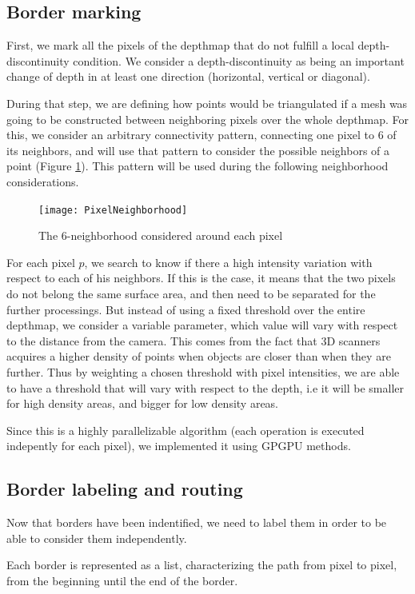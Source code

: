 \documentclass[11pt,fleqn]{book} %
\begin{document}
\subsection{Border marking}
First, we mark all the pixels of the depthmap that do not fulfill a local depth-discontinuity condition. We consider a depth-discontinuity as being an important change of depth in at least one direction (horizontal, vertical or diagonal).

During that step, we are defining how points would be triangulated if a mesh was going to be constructed between neighboring pixels over the whole depthmap. 
For this, we consider an arbitrary connectivity pattern, connecting one pixel to 6 of its neighbors, and will use that pattern to consider the possible neighbors of a point (Figure \ref{fig:pixel_neighborhood}). 
This pattern will be used during the following neighborhood considerations.

\begin{figure}[ht]
\centering\texttt{[image: PixelNeighborhood]}
\caption{The 6-neighborhood considered around each pixel}
\label{fig:pixel_neighborhood}
\end{figure}

For each pixel $p$, we search to know if there a high intensity variation with respect to each of his neighbors. If this is the case, it means that the two pixels do not belong the same surface area, and then need to be separated for the further processings.
But instead of using a fixed threshold over the entire depthmap, we consider a variable parameter, which value will vary with respect to the distance from the camera.
This comes from the fact that 3D scanners acquires a higher density of points when objects are closer than when they are further. 
Thus by weighting a chosen threshold with pixel intensities, we are able to have a threshold that will vary with respect to the depth, i.e it will be smaller for high density areas, and bigger for low density areas.

Since this is a highly parallelizable algorithm (each operation is executed indepently for each pixel), we implemented it using GPGPU methods.

\subsection{Border labeling and routing}
Now that borders have been indentified, we need to label them in order to be able to consider them independently. 

Each border is represented as a list, characterizing the path from pixel to pixel, from the beginning until the end of the border.
\end{document}
